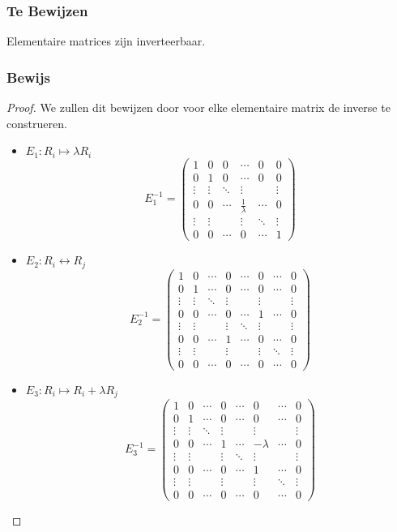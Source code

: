\documentclass[lineaire_algebra_oplossingen.tex]{subfiles}
\begin{document}
\subsubsection*{Te Bewijzen}
Elementaire matrices zijn inverteerbaar.

\subsubsection*{Bewijs}
\begin{proof}
We zullen dit bewijzen door voor elke elementaire matrix de inverse te construeren.
\begin{itemize}
\item $E_1: R_i\mapsto \lambda R_i$
\[
E_1^{-1}=
\begin{pmatrix}
1 & 0 & 0 & \cdots & 0 & 0\\
0 & 1 & 0 & \cdots & 0 & 0\\
\vdots & \vdots & \ddots & \vdots& & \vdots\\
0 & 0 & \cdots & \frac{1}{\lambda} & \cdots & 0\\
\vdots & \vdots & & \vdots& \ddots & \vdots\\
0 & 0 & \cdots & 0 & \cdots &1
\end{pmatrix}
\]

\item $E_2: R_i \leftrightarrow R_j$
\[
E_2^{-1}=
\begin{pmatrix}
1 & 0 & \cdots & 0 & \cdots & 0 & \cdots & 0\\
0 & 1 & \cdots & 0 & \cdots & 0 & \cdots & 0\\
\vdots & \vdots & \ddots & \vdots& & \vdots & &\vdots\\
0 & 0 & \cdots & 0 & \cdots & 1 & \cdots & 0\\
\vdots & \vdots & & \vdots& \ddots & \vdots & &\vdots\\
0 & 0 & \cdots & 1 & \cdots & 0 & \cdots & 0\\
\vdots & \vdots & & \vdots & & \vdots & \ddots & \vdots\\
0 & 0 & \cdots & 0 & \cdots & 0 & \cdots & 0
\end{pmatrix}
\]
\item $E_3: R_i \mapsto R_i + \lambda R_j$
\[
E_3^{-1}=
\begin{pmatrix}
1 & 0 & \cdots & 0 & \cdots & 0 & \cdots & 0\\
0 & 1 & \cdots & 0 & \cdots & 0 & \cdots & 0\\
\vdots & \vdots & \ddots & \vdots& & \vdots & &\vdots\\
0 & 0 & \cdots & 1 & \cdots & -\lambda & \cdots & 0\\
\vdots & \vdots & & \vdots& \ddots & \vdots & &\vdots\\
0 & 0 & \cdots & 0 & \cdots & 1 & \cdots & 0\\
\vdots & \vdots & & \vdots & & \vdots & \ddots & \vdots\\
0 & 0 & \cdots & 0 & \cdots & 0 & \cdots & 0
\end{pmatrix}
\]
\end{itemize}
\end{proof}
\end{document}
